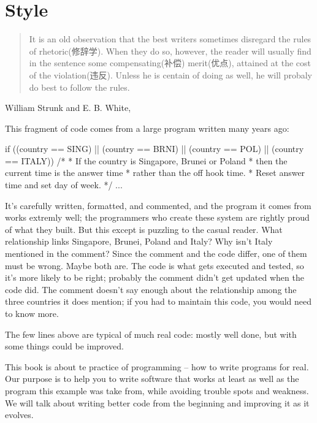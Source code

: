 \chapter{Style}
\label{chap:style}
\begin{quote}
    It is an old observation that the best writers sometimes disregard the
    rules of rhetoric(修辞学). When they do so, however, the reader will
    usually find in the sentence some compensating(补偿) merit(优点),
    attained at the cost of the violation(违反). Unless he is centain of
    doing as well, he will probaly do best to follow the rules.
\end{quote}

\begin{quotesrc}
    William Strunk and E. B. White, 
\end{quotesrc}

This fragment of code comes from a large program written many years ago:
\begin{wellcode}
    if ((country == SING) || (country == BRNI) ||
        (country == POL) || (country == ITALY))
    {
        /*
         * If the country is Singapore, Brunei or Poland
         * then the current time is the answer time 
         * rather than the off hook time.
         * Reset answer time and set day of week.
         */
         ...
    }
\end{wellcode}

It's carefully written, formatted, and commented, and the program it comes
from works extremly well; the programmers who create these system are
rightly proud of what they built. But this except is puzzling to the casual
reader. What relationship links Singapore, Brunei, Poland and Italy? Why
isn't Italy mentioned in the comment? Since the comment and the code
differ, one of them must be wrong. Maybe both are. The code is what gets
executed and tested, so it's more likely to be right; probably the comment
didn't get updated when the code did. The comment doesn't say enough about
the relationship among the three countries it does mention; if you had to
maintain this code, you would need to know more.

The few lines above are typical of much real code: mostly well done, but
with some things could be improved.

This book is about te practice of programming -- how to write programs for
real. Our purpose is to help you to write software that works at least as
well as the program this example was take from, while avoiding trouble
spots and weakness. We will talk about writing better code from the
beginning and improving it as it evolves.

